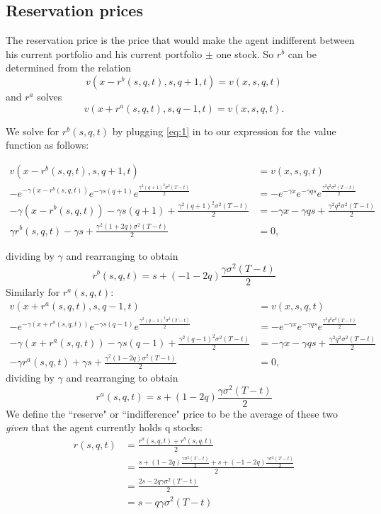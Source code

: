 \subsection*{Reservation prices}

The reservation price is the price that would make the agent indifferent between his current portfolio and his current portfolio $\pm$ one stock. So $r^b$ can be determined from the relation
\begin{equation} \label{eq:1}
    v(x-r^b(s,q,t),s,q+1,t)=v(x,s,q,t)
\end{equation}
and $r^a$ solves
\begin{equation}
    v(x+r^a(s,q,t),s,q-1,t)=v(x,s,q,t).
\end{equation}

We solve for $r^b(s,q,t)$ by plugging \ref{eq:1} in to our expression for the value function as follows:

\begin{align*}
    v(x-r^b(s,q,t),s,q+1,t)&=v(x,s,q,t)\\
    -e^{-\gamma(x-r^b(s,q,t))}e^{-\gamma s(q+1)}e^{\frac{\gamma^2(q+1)^2\sigma^2(T-t)}{2}}&=-e^{-\gamma x}e^{-\gamma q s}e^{\frac{\gamma^2q^2\sigma^2(T-t)}{2}}\\
    -\gamma(x-r^b(s,q,t))-\gamma s(q+1) + \frac{\gamma^2(q+1)^2\sigma^2(T-t)}{2} &= -\gamma x-\gamma q s + \frac{\gamma^2q^2\sigma^2(T-t)}{2}\\
    \gamma r^b(s,q,t)-\gamma s + \frac{\gamma^2(1+2q)\sigma^2(T-t)}{2} &=0,
\end{align*}

dividing by $\gamma$ and rearranging to obtain
\begin{equation}
    r^b(s,q,t)=s+(-1-2q)\frac{\gamma\sigma^2(T-t)}{2}
\end{equation}
Similarly for $r^a(s,q,t)$:
\begin{align*}
    v(x+r^a(s,q,t),s,q-1,t)&=v(x,s,q,t)\\
    -e^{-\gamma(x+r^a(s,q,t))}e^{-\gamma s(q-1)}e^{\frac{\gamma^2(q-1)^2\sigma^2(T-t)}{2}}&=-e^{-\gamma x}e^{-\gamma q s}e^{\frac{\gamma^2q^2\sigma^2(T-t)}{2}}\\
    -\gamma(x+r^a(s,q,t))-\gamma s(q-1)+\frac{\gamma^2(q-1)^2\sigma^2(T-t)}{2}&=-\gamma x-\gamma q s + \frac{\gamma^2q^2\sigma^2(T-t)}{2}\\
    -\gamma r^a(s,q,t) + \gamma s + \frac{\gamma^2(1-2q)\sigma^2(T-t)}{2}&=0,
\end{align*}
dividing by $\gamma$ and rearranging to obtain
\begin{equation}
    r^a(s,q,t)=s+(1-2q)\frac{\gamma\sigma^2(T-t)}{2}
\end{equation}
We define the ``reserve" or ``indifference" price to be the average of these two \textit{given} that the agent currently holds q stocks:
\begin{align*}
    r(s,q,t)&=\frac{r^a(s,q,t)+r^b(s,q,t)}{2}\\
    &=\frac{s+(1-2q)\frac{\gamma\sigma^2(T-t)}{2}+s+(-1-2q)\frac{\gamma\sigma^2(T-t)}{2}}{2}\\
    &=\frac{2s-2q\gamma\sigma^2(T-t)}{2}\\
    &=s-q\gamma\sigma^2(T-t)
\end{align*}

